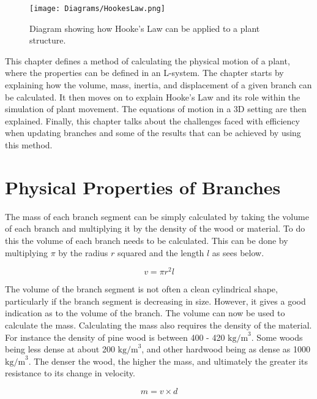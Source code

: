 \begin{figure}[htbp]
	{\centering
		\vspace{7px}
		\texttt{[image: Diagrams/HookesLaw.png]}
		\caption{Diagram showing how Hooke's Law can be applied to a plant structure.} \label{rewriter diagram}
	}
\end{figure}
\FloatBarrier

This chapter defines a method of calculating the physical motion of a plant, where the properties can be defined in an L-system. The chapter starts by explaining how the volume, mass, inertia, and displacement of a given branch can be calculated. It then moves on to explain Hooke's Law and its role within the simulation of plant movement. The equations of motion in a 3D setting are then explained. Finally, this chapter talks about the challenges faced with efficiency when updating branches and some of the results that can be achieved by using this method. 

\section{Physical Properties of Branches}

The mass of each branch segment can be simply calculated by taking the volume of each branch and multiplying it by the density of the wood or material. To do this the volume of each branch needs to be calculated. This can be done by multiplying $\pi$ by the radius $r$ squared and the length $l$ as sees below.

\begin{equation}
v  = \pi r^2 l
\end{equation}

\noindent
The volume of the branch segment is not often a clean cylindrical shape, particularly if the branch segment is decreasing in size. However, it gives a good indication as to the volume of the branch. The volume can now be used to calculate the mass. Calculating the mass also requires the density of the material. For instance the density of pine wood is between 400 - 420 $\text{kg/m}^3$. Some woods being less dense at about 200 $\text{kg/m}^3$, and other hardwood being as dense as 1000$\text{kg/m}^3$. The denser the wood, the higher the mass, and ultimately the greater its resistance to its change in velocity.

\begin{equation}
m = v \times d
\end{equation}

